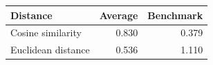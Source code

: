 \begin{tabular}[t]{lrr}
\toprule
Distance & Average & Benchmark \\
\midrule 
Cosine similarity & 0.830 & 0.379 \\
Euclidean distance & 0.536 & 1.110 \\
\bottomrule
\end{tabular}